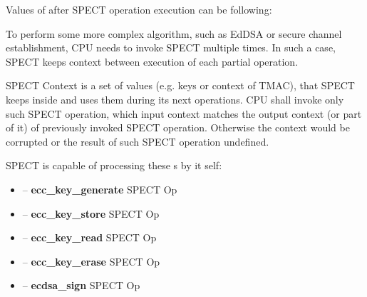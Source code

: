 \vspace{.3cm}
Values of  after SPECT operation execution can be following:



To perform some more complex algorithm, such as EdDSA or secure channel establishment,
CPU needs to invoke SPECT multiple times. In such a case, SPECT keeps context between
execution of each partial operation.

SPECT Context is a set of values (e.g. keys or context of TMAC), that SPECT keeps inside
and uses them during its next operations. CPU shall invoke only such SPECT operation,
which input context matches the output context (or part of it) of previously invoked
SPECT operation. Otherwise the context would be corrupted or the result of such SPECT
operation undefined.

SPECT is capable of processing these \LLLCMD{}s by it self:
\begin{itemize}
    \item {} -- \textbf{ecc_key_generate} SPECT Op
    \item {} -- \textbf{ecc_key_store} SPECT Op
    \item {} -- \textbf{ecc_key_read} SPECT Op
    \item {} -- \textbf{ecc_key_erase} SPECT Op
    \item {} -- \textbf{ecdsa_sign} SPECT Op
\end{itemize}


\clearpage
{}

